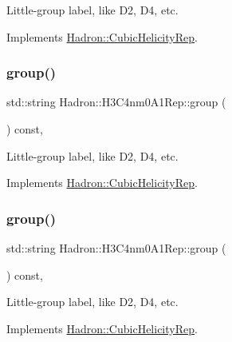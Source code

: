Little-\/group label, like D2, D4, etc. 

Implements \mbox{\hyperlink{structHadron_1_1CubicHelicityRep_a101a7d76cd8ccdad0f272db44b766113}{Hadron\+::\+Cubic\+Helicity\+Rep}}.

\mbox{\label{structHadron_1_1H3C4nm0A1Rep_a031edbff97795d7fd225e9a3d70b5d8f}} 
\subsubsection{\texorpdfstring{group()}{group()}\hspace{0.1cm}{\footnotesize\ttfamily [2/3]}}
{\footnotesize\ttfamily std\+::string Hadron\+::\+H3\+C4nm0\+A1\+Rep\+::group (\begin{DoxyParamCaption}{ }\end{DoxyParamCaption}) const\hspace{0.3cm}{\ttfamily [inline]}, {\ttfamily [virtual]}}

Little-\/group label, like D2, D4, etc. 

Implements \mbox{\hyperlink{structHadron_1_1CubicHelicityRep_a101a7d76cd8ccdad0f272db44b766113}{Hadron\+::\+Cubic\+Helicity\+Rep}}.

\mbox{\label{structHadron_1_1H3C4nm0A1Rep_a031edbff97795d7fd225e9a3d70b5d8f}} 
\subsubsection{\texorpdfstring{group()}{group()}\hspace{0.1cm}{\footnotesize\ttfamily [3/3]}}
{\footnotesize\ttfamily std\+::string Hadron\+::\+H3\+C4nm0\+A1\+Rep\+::group (\begin{DoxyParamCaption}{ }\end{DoxyParamCaption}) const\hspace{0.3cm}{\ttfamily [inline]}, {\ttfamily [virtual]}}

Little-\/group label, like D2, D4, etc. 

Implements \mbox{\hyperlink{structHadron_1_1CubicHelicityRep_a101a7d76cd8ccdad0f272db44b766113}{Hadron\+::\+Cubic\+Helicity\+Rep}}.

